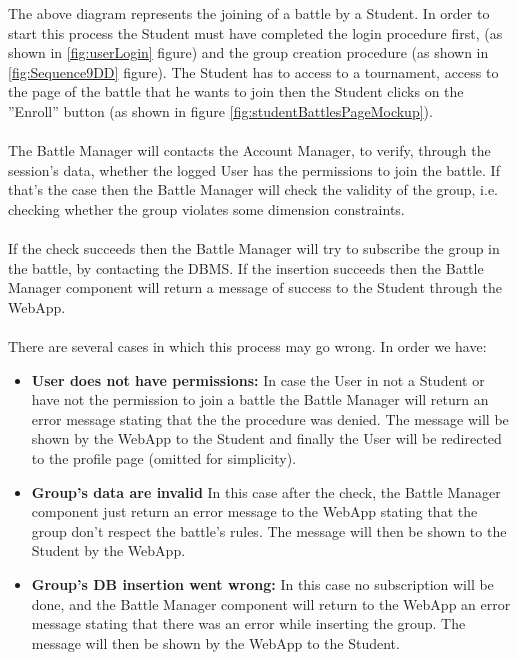 \documentclass{article}
\begin{document}
{        The above diagram represents the joining of a battle by a Student. 
        In order to start this process the Student must have 
        completed the login procedure first, (as shown in \ref{fig:userLogin} figure) and the
        group creation procedure (as shown in \ref{fig:Sequence9DD} figure). 
        The Student has to access to a tournament, access 
        to the page of the battle that he wants to join then the Student
        clicks on the ”Enroll” button (as shown in figure \ref{fig:studentBattlesPageMockup}).
        \\ \\
        The Battle Manager will contacts the Account Manager, to verify, 
        through the session’s data, whether the logged User has the 
        permissions to join the battle. If that’s the case then the Battle 
        Manager will check the validity of the group, i.e. 
        checking whether the group violates some dimension constraints.
        \\ \\
        If the check succeeds then the Battle Manager will try to subscribe 
        the group in the battle, by contacting the DBMS.
        If the insertion succeeds then the Battle Manager component will 
        return a message of success to the Student through the WebApp.
        \\ \\
        There are several cases in which this process may go wrong. In order we have:
        \begin{itemize}
            \item \textbf{User does not have permissions:} In case the User in not a Student 
            or have not the permission to join a battle the Battle Manager will return an 
            error message stating that the the procedure was denied. The message will be shown 
            by the WebApp to the Student and finally the User will be
            redirected to the profile page (omitted for simplicity).
            \item \textbf{Group's data are invalid} In this case after the check, the Battle
            Manager component just return an error message to the WebApp stating that
            the group don't respect the battle's rules. The message will then be shown to the
            Student by the WebApp.
            \item \textbf{Group's DB insertion went wrong:} In this case no subscription will
            be done, and the Battle Manager component will return to the WebApp 
            an error message stating that there was an error while inserting the group. 
            The message will then be shown by the WebApp to the Student.
        \end{itemize}


}
\end{document}

